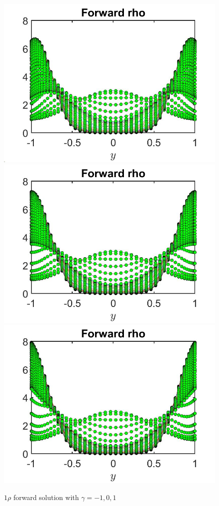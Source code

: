 \documentclass[11pt, a4paper]{article}
\theoremstyle{definition}
\begin{document}
	\begin{figure}[h]
	\includegraphics[scale=0.25]{gamman1a.jpg}
	\includegraphics[scale=0.25]{gamma0a.jpg}
	\includegraphics[scale=0.25]{gamma1a.jpg}
	\caption{$1\rho$ forward solution with $\gamma = -1,0,1$ }
	\label{gamma2}
    \end{figure}
\end{document}
